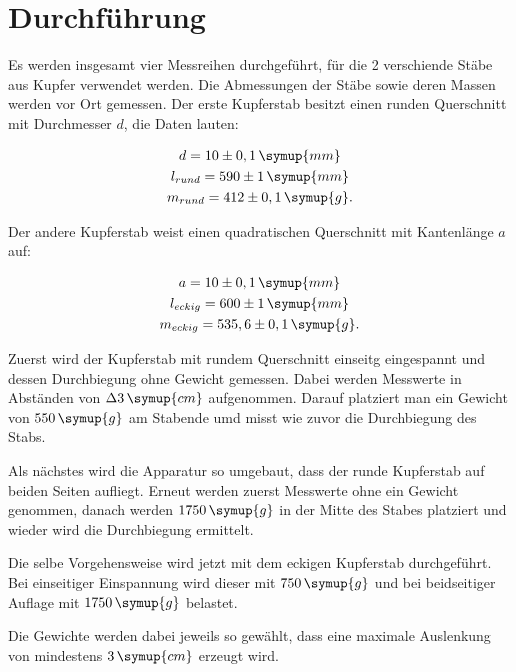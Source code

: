 \section{Durchführung}
\label{sec:Durchführung}

Es werden insgesamt vier Messreihen durchgeführt, für die 2 verschiende Stäbe aus Kupfer verwendet werden.
Die Abmessungen der Stäbe sowie deren Massen werden vor Ort gemessen.
Der erste Kupferstab besitzt einen runden Querschnitt mit Durchmesser $d$, die Daten lauten:

\begin{gather}
    d=10\pm0,1\,\symup{mm} \notag \\
    l_{rund}=590\pm1\,\symup{mm} \notag \\
    m_{rund}=412\pm0,1\,\symup{g} \notag.
\end{gather}

Der andere Kupferstab weist einen quadratischen Querschnitt mit Kantenlänge $a$ auf:

\begin{gather}
    a=10\pm0,1\,\symup{mm} \notag \\
    l_{eckig}=600\pm1\,\symup{mm} \notag \\
    m_{eckig}=535,6\pm0,1\,\symup{g} \notag.
\end{gather}

Zuerst wird der Kupferstab mit rundem Querschnitt einseitg eingespannt und dessen Durchbiegung ohne Gewicht gemessen.
Dabei werden Messwerte in Abständen von $\Delta 3\,\symup{cm}$ aufgenommen.
Darauf platziert man ein Gewicht von $550\,\symup{g}$ am Stabende umd misst wie zuvor die Durchbiegung des Stabs.

Als nächstes wird die Apparatur so umgebaut, dass der runde Kupferstab auf beiden Seiten aufliegt.
Erneut werden zuerst Messwerte ohne ein Gewicht genommen, danach werden $1750\,\symup{g}$
in der Mitte des Stabes platziert und wieder wird die Durchbiegung ermittelt.

Die selbe Vorgehensweise wird jetzt mit dem eckigen Kupferstab durchgeführt.
Bei einseitiger Einspannung wird dieser mit $750\,\symup{g}$ und bei beidseitiger Auflage mit $1750\,\symup{g}$ belastet.

Die Gewichte werden dabei jeweils so gewählt, dass eine maximale Auslenkung von mindestens $3\,\symup{cm}$ erzeugt wird.